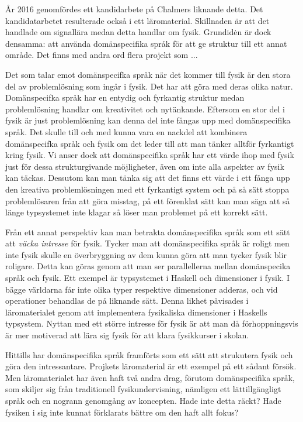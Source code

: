 \begin{binge}
År 2016 genomfördes ett kandidarbete på Chalmers liknande detta. \cite{DSL2016} Det kandidatarbetet resulterade också i ett läromaterial. Skillnaden är att det handlade om signallära medan detta handlar om fysik. Grundidėn är dock densamma: att använda domänspecifika språk för att ge struktur till ett annat område. Det finns med andra ord flera projekt som ...



Det som talar emot domänspecifka språk när det kommer till fysik är den stora del av problemlösning som ingår i fysik. Det har att göra med deras olika natur. Domänspecifka språk har en entydig och fyrkantig struktur medan problemlösning handlar om kreativitet och nytänkande. Eftersom en stor del i fysik är just problemlösning kan denna del inte fångas upp med domänspecifika språk. Det skulle till och med kunna vara en nackdel att kombinera domänspecifka språk och fysik om det leder till att man tänker alltför fyrkantigt kring fysik. Vi anser dock att domänspecifika språk har ett värde ihop med fysik just för dessa strukturgivande möjligheter, även om inte alla aspekter av fysik kan täckas. Dessutom kan man tänka sig att det finns ett värde i ett fånga upp den kreativa problemlösningen med ett fyrkantigt system och på så sätt stoppa problemlösaren från att göra misstag, på ett förenklat sätt kan man säga att så länge typsystemet inte klagar så löser man problemet på ett korrekt sätt.

Från ett annat perspektiv kan man betrakta domänspecifika språk som ett sätt att \textit{väcka intresse} för fysik. Tycker man att domänspecifika språk är roligt men inte fysik skulle en överbryggning av dem kunna göra att man tycker fysik blir roligare. Detta kan göras genom att man ser parallellerna mellan domänspecika språk och fysik. Ett exempel är typsystemet i Haskell och dimensioner i fysik. I bägge världarna får inte olika typer respektive dimensioner adderas, och vid operationer behandlas de på liknande sätt. Denna likhet påvisades i läromaterialet genom att implementera fysikaliska dimensioner i Haskells typsystem. Nyttan med ett större intresse för fysik är att man då förhoppningsvis är mer motiverad att lära sig fysik för att klara fysikkurser i skolan.

Hittills har domänspecifika språk framförts som ett sätt att strukutera fysik och göra den intressantare. Projkets läromaterial är ett exempel på ett sådant försök. Men läromaterialet har även haft två andra drag, förutom domänspecifika språk, som skiljer sig från traditionell fysikundervisning, nämligen ett lättillgängligt språk och en nogrann genomgång av koncepten. Hade inte detta räckt? Hade fysiken i sig inte kunnat förklarats bättre om den haft allt fokus?


\end{binge}
